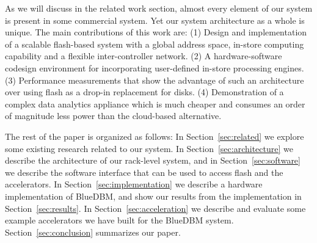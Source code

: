As we will discuss in the related work section, almost every element of our
system is present in some commercial system. Yet our system architecture as a
whole is unique.  The main contributions of this work are: (1) Design and
implementation of a scalable flash-based system with a global address space,
in-store computing capability and a flexible inter-controller network. (2) A
hardware-software codesign environment for incorporating user-defined in-store
processing engines. (3) Performance measurements that show the advantage of such
an architecture over using flash as a drop-in replacement for disks. (4)
Demonstration of a complex data analytics appliance which is much cheaper and
consumes an order of magnitude less power than the cloud-based alternative.

The rest of the paper is organized as follows: In Section~\ref{sec:related} we
explore some existing research related to our system. In
Section~\ref{sec:architecture} we describe the architecture of our rack-level
system, and in Section~\ref{sec:software} we describe the software interface
that can be used to access flash and the accelerators. In
Section~\ref{sec:implementation} we describe a hardware implementation of
BlueDBM, and show our results from the implementation in
Section~\ref{sec:results}.  In Section~\ref{sec:acceleration} we describe and
evaluate some example accelerators we have built for the BlueDBM system. 
Section~\ref{sec:conclusion} summarizes our paper.



